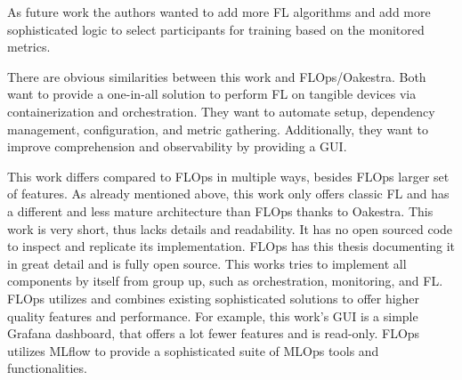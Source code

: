 As future work the authors wanted to add more FL algorithms and add more sophisticated logic to select participants for training based on the monitored metrics.

There are obvious similarities between this work and FLOps/Oakestra.
Both want to provide a one-in-all solution to perform FL on tangible devices via containerization and orchestration.
They want to automate setup, dependency management, configuration, and metric gathering.
Additionally, they want to improve comprehension and observability by providing a GUI.

This work differs compared to FLOps in multiple ways, besides FLOps larger set of features.
As already mentioned above, this work only offers classic FL and has a different and less mature architecture than FLOps thanks to Oakestra.
This work is very short, thus lacks details and readability.
It has no open sourced code to inspect and replicate its implementation.
FLOps has this thesis documenting it in great detail and is fully open source.
This works tries to implement all components by itself from group up, such as orchestration, monitoring, and FL.
FLOps utilizes and combines existing sophisticated solutions to offer higher quality features and performance.
For example, this work's GUI is a simple Grafana dashboard, that offers a lot fewer features and is read-only.
FLOps utilizes MLflow to provide a sophisticated suite of MLOps tools and functionalities.
